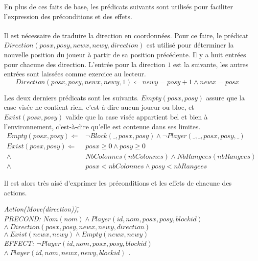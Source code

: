 \documentclass[12pt,english,frenchb,letterpaper]{article}
\begin{document}
En plus de ces faits de base, les prédicats suivants sont utilisés pour faciliter l'expression des préconditions et des effets. \\
\\
Il est nécessaire de traduire la direction en coordonnées. Pour ce faire, le prédicat $Direction(posx,posy,newx,newy,direction)$ est utilisé pour déterminer la nouvelle position du joueur à partir de sa position précédente.  Il y a huit entrées pour chacune des direction.  L'entrée pour la direction $1$ est la suivante, les autres entrées sont laissées comme exercice au lecteur.
\begin{equation*}
	Direction(posx,posy,newx,newy, 1) \Leftarrow newy = posy + 1 \wedge newx = posx 
\end{equation*}

Les deux derniers prédicats sont les suivants.  $Empty(posx,posy)$ assure que la case visée ne contient rien, c'est-à-dire aucun joueur ou bloc, et $Exist(posx,posy)$ valide que la case visée appartient bel et bien à l'environnement, c'est-à-dire qu'elle est contenue dans ses limites.
\begin{eqnarray*}
	Empty(posx,posy) \Leftarrow & \lnot Block(\_,posx,posy)  \wedge \lnot Player(\_,\_,posx,posy,\_) \\
	Exist(posx,posy) \Leftarrow & posx  \geq 0 \wedge posy \geq 0 \\
	                                                    \wedge & NbColonnes(nbColonnes)  \wedge NbRangees(nbRangees) \\
	                                                   \wedge & posx < nbColonnes \wedge posy < nbRangees 
\end{eqnarray*}

Il est alors très aisé d'exprimer les préconditions et les effets de chacune des actions.

\begin{tabbing}
\it{Action}\=\it{(Move(direction))}\=,\\
\> PRECOND: \> $Nom(nom) \wedge Player(id,nom,posx,posy,blockid)$ \\ 
\> \> $  \wedge \ Direction(posx,posy,newx,newy,direction) $ \\
\> \> $   \wedge \ Exist(newx,newy) \wedge Empty(newx,newy) $ \\               
\> EFFECT: \>$ \lnot Player(id,nom,posx,posy,blockid) $ \\
\>  \> $\wedge\ Player(id,nom,newx,newy,blockid)$ .\\
\end{tabbing}
\end{document}
